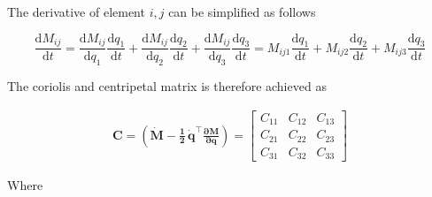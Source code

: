 The derivative of element $i, j$ can be simplified as follows

\begin{equation}
    \frac{\mathrm{d} M_{ij}}{\mathrm{d} t} = \frac{\mathrm{d} M_{ij}}{\mathrm{d} q_1} \frac{\mathrm{d} q_1}{\mathrm{d} t} + \frac{\mathrm{d} M_{ij}}{\mathrm{d} q_2} \frac{\mathrm{d} q_2}{\mathrm{d} t} + \frac{\mathrm{d} M_{ij}}{\mathrm{d} q_3} \frac{\mathrm{d} q_3}{\mathrm{d} t} = M_{ij1} \frac{\mathrm{d} q_1}{\mathrm{d} t} + M_{ij2} \frac{\mathrm{d} q_2}{\mathrm{d} t} + M_{ij3} \frac{\mathrm{d} q_3}{\mathrm{d} t}
\end{equation}

The coriolis and centripetal matrix is therefore achieved as

\begin{align}
    \mathbf{C} = \left ( \mathbf{ \dot{M} - \frac{1}{2} \, \dot{q}^\top \frac{\partial M}{\partial q} } \right ) = \begin{bmatrix}
        C_{11} & C_{12} & C_{13} \\
        C_{21} & C_{22} & C_{23} \\
        C_{31} & C_{32} & C_{33}
        \end{bmatrix}
    \label{eq:3r-dyn-cc-matrix}
\end{align}

Where

